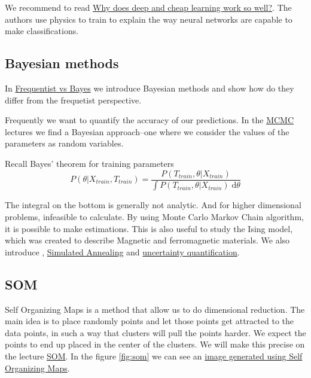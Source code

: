 \documentclass[11pt,letterpaper]{report}
\begin{document}
	
	We recommend to read 	\href{    https://arxiv.org/abs/1608.08225 
	}{Why does deep and cheap learning work so well?}\cite{Lin2017}.  The authors use physics to train to explain the way neural networks are capable to make classifications. 
\subsection{Bayesian methods}
In 	\href{ http://nbviewer.jupyter.org/mendozacortesgroup/machine_learning_class/blob/master/Lectures_Jupyter/L10_Naive_Bayes/Frequentist_vs_Bayes.ipynb} {Frequentist vs Bayes}
 we introduce Bayesian methods and show how do they differ from the frequetist perspective. 
 
Frequently we want to quantify the accuracy of our predictions. In the \href{ http://nbviewer.jupyter.org/mendozacortesgroup/machine_learning_class/blob/master/Lectures_Jupyter/L11_Markov/MonteCarloIntroduction.ipynb} {MCMC}  lectures we find a Bayesian approach--one where we consider the values of the parameters as random variables.

Recall Bayes' theorem for training parameters
\begin{equation}
P(\theta|X_{train}, T_{train}) = \frac{P(T_{train}, \theta|X_{train})}{\int P(T_{train}, \theta|X_{train})\;\mathrm{d}\theta} 
\end{equation}

The integral on the bottom is generally not analytic. And for higher dimensional problems, infeasible to calculate. By using Monte Carlo Markov Chain algorithm, it is possible to make estimations.  This is also useful to study   the Ising model, which was created to describe Magnetic and ferromagnetic materials. We also introduce , \href{ http://nbviewer.jupyter.org/mendozacortesgroup/machine_learning_class/blob/master/Lectures_Jupyter/L11_Markov/Simulated\%20Annealing.ipynb} {Simulated Annealing} and \href{ http://nbviewer.jupyter.org/mendozacortesgroup/machine_learning_class/blob/master/Lectures_Jupyter/L11_Markov/Uncertainty\%20Quantification.ipynb} {uncertainty quantification}.
\subsection{SOM}
Self Organizing Maps is a method that allow us to do dimensional reduction. The main idea is to place randomly points and let those points get attracted to the data points, in such a way that clusters will pull the points harder. We expect the points to end up placed in the center of the clusters. We will make this precise on the lecture \href{ http://nbviewer.jupyter.org/mendozacortesgroup/machine_learning_class/blob/master/Lectures_Jupyter/L6_SOM/SOM.ipynb} {SOM}. 
In the figure \ref{fig:som} we can see an \href{https://github.com/ANNetGPGPU/ANNetGPGPU}{ image
	generated using Self Organizing Maps}\cite{wsom}.
\end{document}
